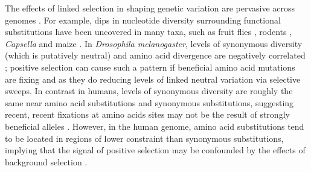 The effects of linked selection in shaping genetic variation are pervasive across genomes \citep{begun_levels_1992, cai_pervasive_2009, murphy_broad-scale_2022, lohmueller_natural_2011, corbett-detig_natural_2015, murphy_broad-scale_2022}.
For example, dips in nucleotide diversity surrounding functional substitutions have been uncovered in many taxa, 
such as fruit flies \citep{kern_genomic_2002,sattath_pervasive_2011}, rodents \citep{halligan_contributions_2013}, \textit{Capsella} \citep{williamson_evidence_2014} and maize \citep{beissinger_recent_2016}.
In \textit{Drosophila melanogaster}, levels of synonymous diversity (which is putatively neutral) and amino acid divergence are negatively correlated \citep{andolfatto_hitchhiking_2007, macpherson_genomewide_2007};
positive selection can cause such a pattern if beneficial amino acid mutations are fixing and as they do reducing levels of linked neutral variation via selective sweeps.
In contrast in humans, levels of synonymous diversity are roughly the same near amino acid substitutions and synonymous substitutions,
suggesting recent, recent fixations at amino acids sites may not be the result of strongly beneficial alleles \parencite{hernandez_classic_2011,lohmueller_natural_2011}.
However, in the human genome, amino acid substitutions tend to be located in regions of lower constraint than synonymous substitutions,
implying that the signal of positive selection may be confounded by the effects of background selection \parencite{enard_genome-wide_2014}.


